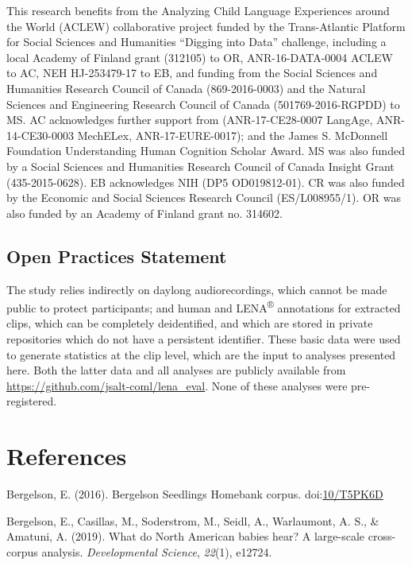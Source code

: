 \documentclass[english,floatsintext,man]{apa6}
\begin{document}
This research benefits from the Analyzing Child Language Experiences
around the World (ACLEW) collaborative project funded by the
Trans-Atlantic Platform for Social Sciences and Humanities
\enquote{Digging into Data} challenge, including a local Academy of
Finland grant (312105) to OR, ANR-16-DATA-0004 ACLEW to AC, NEH
HJ-253479-17 to EB, and funding from the Social Sciences and Humanities
Research Council of Canada (869-2016-0003) and the Natural Sciences and
Engineering Research Council of Canada (501769-2016-RGPDD) to MS. AC
acknowledges further support from (ANR-17-CE28-0007 LangAge,
ANR-14-CE30-0003 MechELex, ANR-17-EURE-0017); and the James S. McDonnell
Foundation Understanding Human Cognition Scholar Award. MS was also
funded by a Social Sciences and Humanities Research Council of Canada
Insight Grant (435-2015-0628). EB acknowledges NIH (DP5 OD019812-01). CR
was also funded by the Economic and Social Sciences Research Council
(ES/L008955/1). OR was also funded by an Academy of Finland grant no.
314602.

\subsection{Open Practices Statement}\label{open-practices-statement}

The study relies indirectly on daylong audiorecordings, which cannot be
made public to protect participants; and human and
LENA\textsuperscript{®} annotations for extracted clips, which can be
completely deidentified, and which are stored in private repositories
which do not have a persistent identifier. These basic data were used to
generate statistics at the clip level, which are the input to analyses
presented here. Both the latter data and all analyses are publicly
available from \url{https://github.com/jsalt-coml/lena_eval}. None of
these analyses were pre-registered.

\newpage

\section{References}\label{references}

\setlength{\parindent}{-0.5in} \setlength{\leftskip}{0.5in}

\hypertarget{refs}{}
\hypertarget{ref-bergelson2016bergelson}{}
Bergelson, E. (2016). Bergelson Seedlings Homebank corpus.
doi:\href{https://doi.org/10/T5PK6D}{10/T5PK6D}

\hypertarget{ref-bergelson2019north}{}
Bergelson, E., Casillas, M., Soderstrom, M., Seidl, A., Warlaumont, A.
S., \& Amatuni, A. (2019). What do North American babies hear? A
large-scale cross-corpus analysis. \emph{Developmental Science},
\emph{22}(1), e12724.
\end{document}
